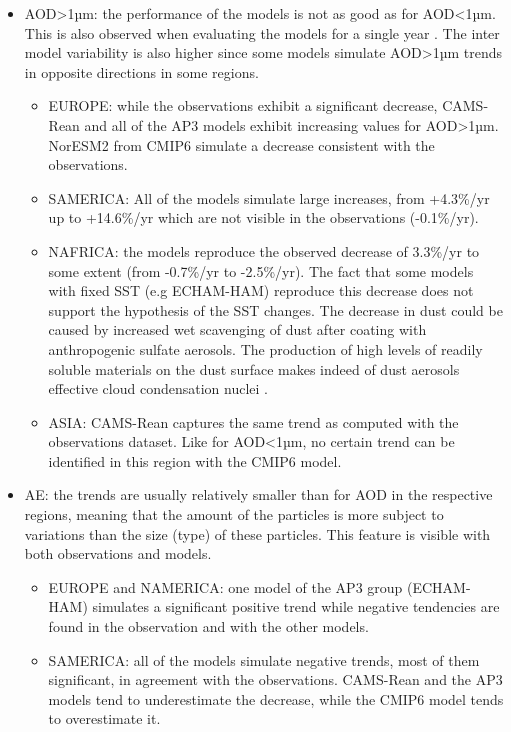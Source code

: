 \documentclass[journal abbreviation, manuscript]{copernicus}
\begin{document}
\begin{itemize}
\begin{itemize}
       \end{itemize}
 \item AOD>1µm: the performance of the models is not as good as for AOD<1µm. This is also observed when evaluating the models for a single year \citep{jonaseval}. The inter model variability is also higher since some models simulate AOD>1µm trends in opposite directions in some regions.
       \begin{itemize}
        \item EUROPE: while the observations exhibit a significant decrease, CAMS-Rean and all of the AP3 models exhibit increasing values for AOD>1µm. NorESM2 from CMIP6 simulate a decrease consistent with the observations.
        \item SAMERICA: All of the models simulate large increases, from +4.3\%/yr up to +14.6\%/yr  which are not visible in the observations (-0.1\%/yr).
        \item NAFRICA: the models reproduce the observed decrease of 3.3\%/yr to some extent (from -0.7\%/yr to -2.5\%/yr). The fact that some 
        models with fixed SST (e.g ECHAM-HAM) reproduce this decrease does not support the hypothesis of the SST changes. The decrease in dust could be caused by increased wet scavenging of dust after coating with anthropogenic sulfate aerosols. The production of high levels of readily soluble materials on the dust surface makes indeed of dust aerosols effective cloud condensation nuclei \citep{fan2004impact,bauer2005impact,bauer2007sulfate,neubauer2019global}.
        \item ASIA: CAMS-Rean captures the same trend as computed with the observations dataset. Like for AOD<1µm, no certain trend can be identified  in this region with the CMIP6 model.
       \end{itemize}
 \item AE: the trends are usually relatively smaller than for AOD in the respective regions, meaning that the amount of the particles is more subject to variations than the size (type) of these particles. This feature is visible with both observations and models.
       \begin{itemize}
        \item EUROPE and NAMERICA: one model of the AP3 group (ECHAM-HAM) simulates a significant positive trend while negative tendencies are found in the observation and with the other models.
        \item SAMERICA: all of the models simulate negative trends, most of them significant, in agreement with the observations. CAMS-Rean and the AP3 models tend to underestimate the decrease, while the CMIP6 model tends to overestimate it.

\end{itemize}
\end{itemize}
\end{document}
